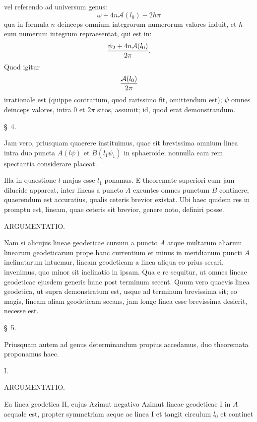 \begingroup\small
vel referendo ad universum genus:
\[
 \omega+4n\mathcal A(l_0)-2h\pi
\]
qua in formula $n$ deinceps omnium integrorum numerorum valores induit, et $h$ eum numerum integrum repraesentat, qui est in:
\[
 {\psi_2+4n\mathcal A(l_0)\over 2\pi}.
\]
Quod igitur
\[
 {\mathcal A(l_0)\over 2\pi}
\]
irrationale est (quippe contrarium, quod rarissimo fit, omittendum est); $\psi$ omnes deinceps valores, intra $0$ et $2\pi$ sitos, assumit; id, quod erat demonstrandum.

\begin{center}\S\ 4.\end{center}

Jam vero, priusquam quaerere instituimus, quae sit brevissima omnium linea intra duo puncta $A(l\psi)$ et $B(l_1\psi_1)$ in sphaeroide; nonnulla eam rem spectantia considerare placeat.

Illa in quaestione $l$ majus esse $l_1$ ponamus. E theoremate superiori cum jam dilucide appareat, inter lineas a puncto $A$ exeuntes omnes punctum $B$ continere; quaerendum est accuratius, qualis ceteris brevior existat. Ubi haec quidem res in promptu est, lineam, quae ceteris sit brevior, genere noto, definiri posse.

\begin{center}ARGUMENTATIO.\end{center}

Nam si alicujus lineae geodeticae cursum a puncto $A$ atque multarum aliarum linearum geodeticarum prope hanc currentium et minus in meridianum puncti $A$ inclinatarum intuemur, lineam geodeticam a linea aliqua eo prius secari, invenimus, quo minor sit inclinatio in ipsam. Qua e re sequitur, ut omnes lineae geodeticae ejusdem generis hanc post terminum secent. Quum vero quaevis linea geodetica, ut supra demonstratum est, usque ad terminum brevissima sit; eo magis, lineam aliam geodeticam secans, jam longe linea esse brevissima desierit, necesse est.

\begin{center}\S\ 5.\end{center}

Priusquam autem ad genus determinandum propius accedamus, duo theoremata proponamus haec.

I. 

\begin{center}ARGUMENTATIO.\end{center}

Ea linea geodetica II, cujus Azimut negativo Azimut lineae geodeticae I in $A$ aequale est, propter symmetriam aeque ac linea I et tangit circulum $l_0$ et continet
\endgroup
